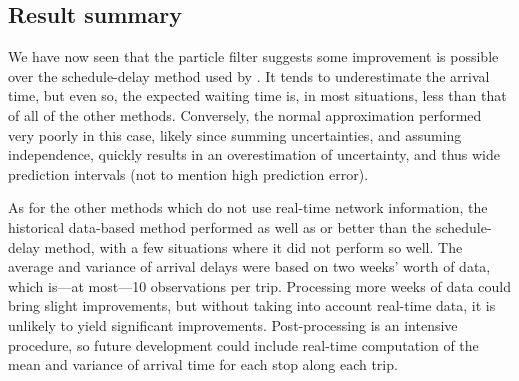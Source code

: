 \subsection{Result summary}
\label{sec:prediction_model_comp_summary}

We have now seen that the particle filter suggests some improvement is possible over the schedule-delay method used by \AT. It tends to underestimate the arrival time, but even so, the expected waiting time is, in most situations, less than that of all of the other methods. Conversely, the normal approximation performed very poorly in this case, likely since summing uncertainties, and assuming independence, quickly results in an overestimation of uncertainty, and thus wide prediction intervals (not to mention high prediction error).

As for the other methods which do not use real-time network information, the historical data-based method performed as well as or better than the schedule-delay method, with a few situations where it did not perform so well. The average and variance of arrival delays were based on two weeks' worth of data, which is---at most---10 observations per trip. Processing more weeks of data could bring slight improvements, but without taking into account real-time data, it is unlikely to yield significant improvements. Post-processing is an intensive procedure, so future development could include real-time computation of the mean and variance of arrival time for each stop along each trip.
